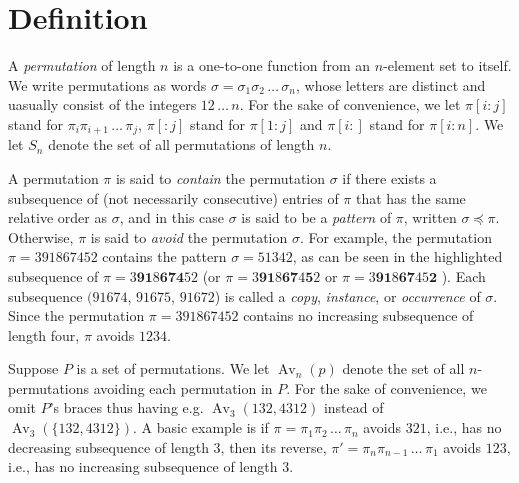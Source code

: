 \documentclass[a4paper]{llncs}
\DeclareMathOperator{\RED}{red}
\DeclareMathOperator{\AV}{Av}
\begin{document}
	
\section{Definition}
\label{section:Definitions}

A \emph{permutation} of length $n$ is a one-to-one function from an
$n$-element set to itself.
We write permutations as words 
$\sigma = \sigma_1\sigma_2\,\ldots\,\sigma_n$, whose letters are distinct
and uasually consist of the integers $12\,\ldots\,n$.
For the sake of convenience, 
we let 
$\pi[i:j]$ stand for 
$\pi_i\pi_{i+1}\,\ldots\,\pi_j$,
$\pi[:j]$ stand for $\pi[1:j]$ and
$\pi[i:]$ stand for $\pi[i:n]$.
We let $S_n$ denote the set of all permutations of length $n$.


A permutation $\pi$ is said to \emph{contain} the permutation $\sigma$ 
if there exists a subsequence of (not necessarily consecutive) 
entries of $\pi$ that has the same relative order as $\sigma$, 
and in this case $\sigma$ is said to be a \emph{pattern} of 
$\pi$, written $\sigma \preceq \pi$. 
Otherwise, $\pi$ is said to \emph{avoid} the permutation $\sigma$. 
For example, the permutation $\pi = 391867452$ 
contains the pattern $\sigma = 51342$, 
as can be seen in the highlighted subsequence of 
$\pi = 3\mathbf{9}\mathbf{1}8\mathbf{6}\mathbf{7}\mathbf{4}52$
(or 
$\pi = 3\mathbf{9}\mathbf{1}8\mathbf{6}\mathbf{7}4\mathbf{5}2$
or
$\pi = 3\mathbf{9}\mathbf{1}8\mathbf{6}\mathbf{7}45\mathbf{2}$
). 
Each subsequence $(91674$, 
$91675$, 
$91672$) is called a 
\emph{copy}, 
\emph{instance}, or 
\emph{occurrence} of $\sigma$. 
Since the permutation $\pi = 391867452$  contains no increasing subsequence of length four, $\pi$ avoids $1234$.

Suppose $P$ is a set of permutations. We let $\AV_n(p)$ denote the
set of all $n$-permutations avoiding each permutation in $P$.
For the sake of convenience, we omit $P$'s braces thus having
e.g. $\AV_3(132,4312)$ instead of
$\AV_3(\{132,4312\})$.
A basic example is if 
$\pi = \pi_1\pi_2\,\ldots\,\pi_n$ avoids $321$, i.e., 
has no decreasing subsequence of length $3$, then its reverse, 
$\pi' = \pi_n\pi_{n-1}\,\ldots\,\pi_1$ avoids $123$, i.e., 
has no increasing subsequence of length $3$.
\end{document}
